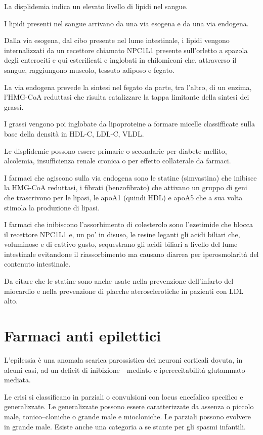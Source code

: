 La displidemia indica un elevato livello di lipidi nel sangue. 

I lipidi presenti nel sangue arrivano da una via esogena e da una via endogena.

Dalla via esogena, dal cibo presente nel lume intestinale, i lipidi vengono internalizzati da un recettore chiamato NPC1L1 presente sull'orletto a spazola degli enterociti e qui esterificati e inglobati in chilomiconi che, attraverso il sangue, raggiungono muscolo, tessuto adiposo e fegato.

La via endogena prevede la sintesi nel fegato da parte, tra l'altro, di un enzima, l'HMG-CoA reduttasi che risulta catalizzare la tappa limitante della sintesi dei grassi.

I grassi vengono poi inglobate da lipoproteine a formare micelle classifficate sulla base della densità in HDL-C, LDL-C, VLDL.

Le displidemie possono essere primarie o secondarie per diabete mellito, alcolemia, insufficienza renale cronica o per effetto collaterale da farmaci.

I farmaci che agiscono sulla via endogena sono le statine (simvastina) che inibisce la HMG-CoA reduttasi, i fibrati (benzofibrato) che attivano un gruppo di geni che trascrivono per le lipasi, le apoA1 (quindi HDL) e apoA5 che a sua volta stimola la produzione di lipasi.

I farmaci che inibiscono l'assorbimento di colesterolo sono l'ezetimide che blocca il recettore NPC1L1 e, un po' in disuso, le resine leganti gli acidi biliari che, voluminose e di cattivo gusto, sequestrano gli acidi biliari a livello del lume intestinale evitandone il riassorbimento ma causano diarrea per iperosmolarità del contenuto intestinale.

Da citare che le statine sono anche usate nella prevenzione dell'infarto del miocardio e nella prevenzione di placche aterosclerotiche in pazienti con LDL alto.

\section{Farmaci anti epilettici}

L'epilessia è una anomala scarica parossistica dei neuroni corticali dovuta, in alcuni casi, ad un deficit di inibizione~--mediato e ipereccitabilità glutammato--mediata.

Le crisi si classificano in parziali o convulsioni con locus encefalico specifico e generalizzate. Le generalizzate possono essere caratterizzate da assenza o piccolo male, tonico--cloniche o grande male e miocloniche. Le parziali possono evolvere in grande male. Esiste anche una categoria a se stante per gli spasmi infantili.

